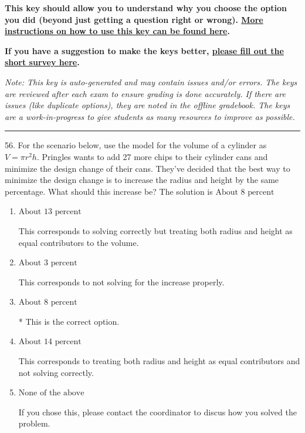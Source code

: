 \documentclass{extbook}[14pt]
\begin{document}
\textbf{This key should allow you to understand why you choose the option you did (beyond just getting a question right or wrong). \href{https://xronos.clas.ufl.edu/mac1105spring2020/courseDescriptionAndMisc/Exams/LearningFromResults}{More instructions on how to use this key can be found here}.}

\textbf{If you have a suggestion to make the keys better, \href{https://forms.gle/CZkbZmPbC9XALEE88}{please fill out the short survey here}.}

\textit{Note: This key is auto-generated and may contain issues and/or errors. The keys are reviewed after each exam to ensure grading is done accurately. If there are issues (like duplicate options), they are noted in the offline gradebook. The keys are a work-in-progress to give students as many resources to improve as possible.}

\rule{\textwidth}{0.4pt}

56. For the scenario below, use the model for the volume of a cylinder as $V = \pi r^2 h$.
Pringles wants to add 27  more chips to their cylinder cans and minimize the design change of their cans. They've decided that the best way to minimize the design change is to increase the radius and height by the same percentage. What should this increase be? 
The solution is $ \text{About } 8 \text{ percent} $ 

\begin{enumerate}[label=\Alph*.] 
\item $ \text{About } 13 \text{ percent} $ 

 This corresponds to solving correctly but treating both radius and height as equal contributors to the volume. 
\item $ \text{About } 3 \text{ percent} $ 

 This corresponds to not solving for the increase properly. 
\item $ \text{About } 8 \text{ percent} $ 

 * This is the correct option. 
\item $ \text{About } 14 \text{ percent} $ 

 This corresponds to treating both radius and height as equal contributors and not solving correctly. 
\item $ \text{None of the above} $ 

 If you chose this, please contact the coordinator to discus how you solved the problem. 
\end{enumerate} 
 
\end{document}
